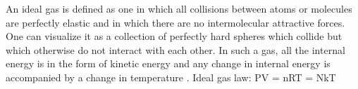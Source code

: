An ideal gas is defined as one in which all collisions between atoms or molecules are perfectly elastic and in which there are no intermolecular attractive forces. One can visualize it as a collection of perfectly hard spheres which collide but which otherwise do not interact with each other. In such a gas, all the internal energy is in the form of kinetic energy and any change in internal energy is accompanied by a change in temperature .
Ideal gas law: PV = nRT = NkT
